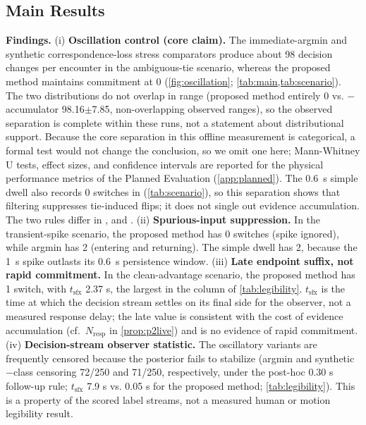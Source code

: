 \subsection{Main Results}\label{subsec:main}





\noindent\textbf{Findings.} (i) \textbf{Oscillation control (core claim).} The immediate-argmin and synthetic correspondence-loss stress comparators produce about 98 decision changes per encounter in the ambiguous-tie scenario, whereas the proposed method maintains commitment at 0 (\cref{fig:oscillation}; \cref{tab:main,tab:scenario}). The two distributions do not overlap in range (proposed method entirely 0 vs. $-$accumulator 98.16$\pm$7.85, non-overlapping observed ranges), so the observed separation is complete within these runs, not a statement about distributional support. Because the core separation in this offline measurement is categorical, a formal test would not change the conclusion, so we omit one here; Mann-Whitney U tests, effect sizes, and confidence intervals are reported for the physical performance metrics of the Planned Evaluation (\cref{app:planned}). The 0.6~s simple dwell also records 0 switches in  (\cref{tab:scenario}), so this separation shows that filtering suppresses tie-induced flips; it does not single out evidence accumulation. The two rules differ in ,  and . (ii) \textbf{Spurious-input suppression.} In the transient-spike scenario, the proposed method has 0 switches (spike ignored), while argmin has 2 (entering and returning). The simple dwell has 2, because the 1~s spike outlasts its 0.6~s persistence window. (iii) \textbf{Late endpoint suffix, not rapid commitment.} In the clean-advantage scenario, the proposed method has 1 switch, with $t_{\text{sfx}}$ 2.37 s, the largest in the  column of \cref{tab:legibility}. $t_{\text{sfx}}$ is the time at which the decision stream settles on its final side for the observer, not a measured response delay; the late value is consistent with the cost of evidence accumulation (cf.\ $N_{\text{resp}}$ in \cref{prop:p2live}) and is no evidence of rapid commitment. (iv) \textbf{Decision-stream observer statistic.} The oscillatory variants are frequently censored because the posterior fails to stabilize (argmin and synthetic $-$class censoring 72/250 and 71/250, respectively, under the post-hoc 0.30 s follow-up rule;  $t_{\text{sfx}}$ 7.9 s vs. 0.05 s for the proposed method; \cref{tab:legibility}). This is a property of the scored label streams, not a measured human or motion legibility result.

